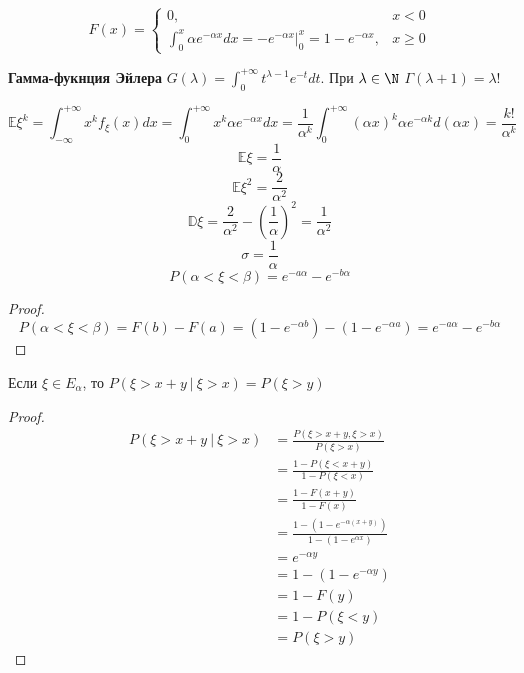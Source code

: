 \[F(x) = \begin{cases}
        0 ,                                                                                    & x < 0    \\
        \int_0^x \alpha e^{ - \alpha x} dx = - e^{ - \alpha x}\Big|_0^x = 1 - e^{ - \alpha x}, & x \geq 0
    \end{cases}\]

\begin{definition}
    \textbf{Гамма-фукнция Эйлера} \(G(\lambda) = \int_0^{+\infty} t^{\lambda - 1} e^{ - t}dt\). При \(\lambda \in \N\) \(\Gamma(\lambda + 1) = \lambda!\)
\end{definition}

\[\mathbb{E}\xi^k = \int_{ -\infty}^{+\infty} x^k f_\xi(x) dx = \int_0^{+\infty} x^k \alpha e^{ - \alpha x} dx = \frac{1}{\alpha^k} \int_0^{+\infty} (\alpha x)^k \alpha e^{ - \alpha k} d(\alpha x) = \frac{k!}{\alpha^k} \]
\[\mathbb{E}\xi = \frac{1}{\alpha}\]
\[\mathbb{E}\xi^2 = \frac{2}{\alpha^2}\]
\[\mathbb{D}\xi = \frac{2}{\alpha^2} - \left( \frac{1}{\alpha} \right)^2 = \frac{1}{\alpha^2}\]
\[\sigma = \frac{1}{\alpha}\]
\[P(\alpha < \xi < \beta) = e^{ - a\alpha} - e^{ - b\alpha}\]
\begin{proof}
    \[P(\alpha < \xi < \beta) = F(b) - F(a) = (1 - e^{ - \alpha b}) - (1 - e^{ - \alpha a}) = e^{ - a\alpha} - e^{ - b\alpha}\]
\end{proof}

\begin{theorem}
    Если \(\xi \in E_\alpha\), то \(P(\xi > x + y\ |\ \xi > x) = P(\xi > y)\)
\end{theorem}
\begin{proof}
    \begin{align*}
        P(\xi > x + y\ |\ \xi > x) & = \frac{P(\xi > x + y, \xi > x)}{P(\xi > x)}                     \\
                                   & = \frac{1 - P(\xi < x + y)}{1 - P(\xi < x)}                      \\
                                   & = \frac{1 - F(x + y)}{1 - F(x)}                                  \\
                                   & = \frac{1 - (1 - e^{ - \alpha (x + y)})}{1 - (1 - e^{\alpha x})} \\
                                   & = e^{ - \alpha y}                                                \\
                                   & = 1 - (1 - e^{ - \alpha y})                                      \\
                                   & = 1 - F(y)                                                       \\
                                   & =  1 - P(\xi < y)                                                \\
                                   & = P(\xi > y)
    \end{align*}
\end{proof}

